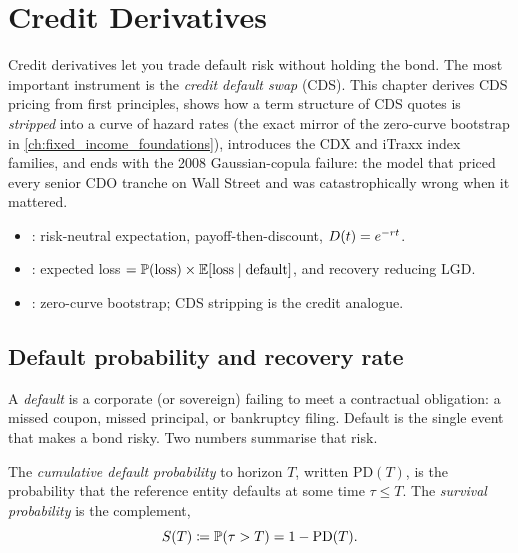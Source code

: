 \chapter{Credit Derivatives}
\label{ch:credit_derivatives}

Credit derivatives let you trade default risk without holding the
bond.  The most important instrument is the \emph{credit default
swap} (CDS).  This chapter derives CDS pricing from first principles,
shows how a term structure of CDS quotes is \emph{stripped} into a
curve of hazard rates (the exact mirror of the zero-curve bootstrap
in \cref{ch:fixed_income_foundations}), introduces the CDX and
iTraxx index families, and ends with the 2008 Gaussian-copula
failure: the model that priced every senior CDO tranche on Wall
Street and was catastrophically wrong when it mattered.

\begin{backgroundbox}[Prerequisites]
\begin{itemize}
  \item {}: risk-neutral expectation,
    payoff-then-discount, $D(t) = e^{-r t}$.
  \item {}: expected loss
    $= \mathbb{P}(\text{loss}) \times \mathbb{E}[\text{loss}\mid\text{default}]$,
    and recovery reducing LGD.
  \item {}: zero-curve bootstrap;
    CDS stripping is the credit analogue.
\end{itemize}
\end{backgroundbox}


\section{Default probability and recovery rate}
\label{sec:pd_recovery}

A \emph{default} is a corporate (or sovereign) failing to meet a
contractual obligation: a missed coupon, missed principal, or
bankruptcy filing.  Default is the single event that makes a bond
risky.  Two numbers summarise that risk.

\begin{definition}
The \emph{cumulative default probability} to horizon $T$, written
$\mathrm{PD}(T)$, is the probability that the reference entity
defaults at some time $\tau \le T$.  The \emph{survival probability}
is the complement,
\[
  S(T) \coloneqq \mathbb{P}(\tau > T) = 1 - \mathrm{PD}(T).
\]
\end{definition}

